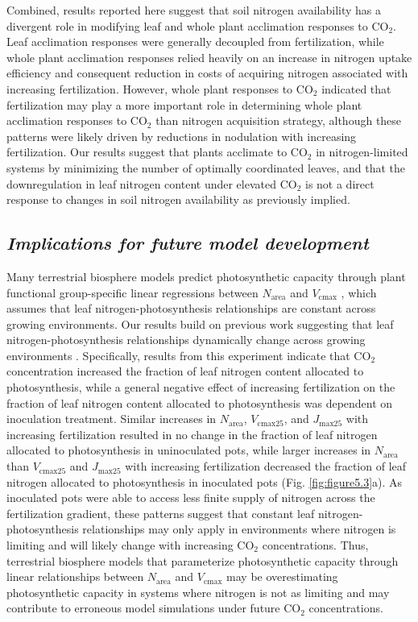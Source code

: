 Combined, results reported here suggest that soil nitrogen availability has a divergent role in modifying leaf and whole plant acclimation responses to CO$_2$. Leaf acclimation responses were generally decoupled from fertilization, while whole plant acclimation responses relied heavily on an increase in nitrogen uptake efficiency and consequent reduction in costs of acquiring nitrogen associated with increasing fertilization. However, whole plant responses to CO$_2$ indicated that fertilization may play a more important role in determining whole plant acclimation responses to CO$_2$ than nitrogen acquisition strategy, although these patterns were likely driven by reductions in nodulation with increasing fertilization. Our results suggest that plants acclimate to CO$_2$ in nitrogen-limited systems by minimizing the number of optimally coordinated leaves, and that the downregulation in leaf nitrogen content under elevated CO$_2$ is not a direct response to changes in soil nitrogen availability as previously implied.

\subsection{\textit{Implications for future model development}}
Many terrestrial biosphere models predict photosynthetic capacity through plant functional group-specific linear regressions between $N_\mathrm{area}$ and $V_\mathrm{cmax}$ , which assumes that leaf nitrogen-photosynthesis relationships are constant across growing environments. Our results build on previous work suggesting that leaf nitrogen-photosynthesis relationships dynamically change across growing environments . Specifically, results from this experiment indicate that CO$_2$ concentration increased the fraction of leaf nitrogen content allocated to photosynthesis, while a general negative effect of increasing fertilization on the fraction of leaf nitrogen content allocated to photosynthesis was dependent on inoculation treatment. Similar increases in $N_\mathrm{area}$, $V_\mathrm{cmax25}$, and $J_\mathrm{max25}$ with increasing fertilization resulted in no change in the fraction of leaf nitrogen allocated to photosynthesis in uninoculated pots, while larger increases in $N_\mathrm{area}$ than $V_\mathrm{cmax25}$ and $J_\mathrm{max25}$ with increasing fertilization decreased the fraction of leaf nitrogen allocated to photosynthesis in inoculated pots (Fig. \ref{fig:figure5.3}a). As inoculated pots were able to access less finite supply of nitrogen across the fertilization gradient, these patterns suggest that constant leaf nitrogen-photosynthesis relationships may only apply in environments where nitrogen is limiting and will likely change with increasing CO$_2$ concentrations. Thus, terrestrial biosphere models that parameterize photosynthetic capacity through linear relationships between $N_\mathrm{area}$ and $V_\mathrm{cmax}$  may be overestimating photosynthetic capacity in systems where nitrogen is not as limiting and may contribute to erroneous model simulations under future CO$_2$ concentrations.

